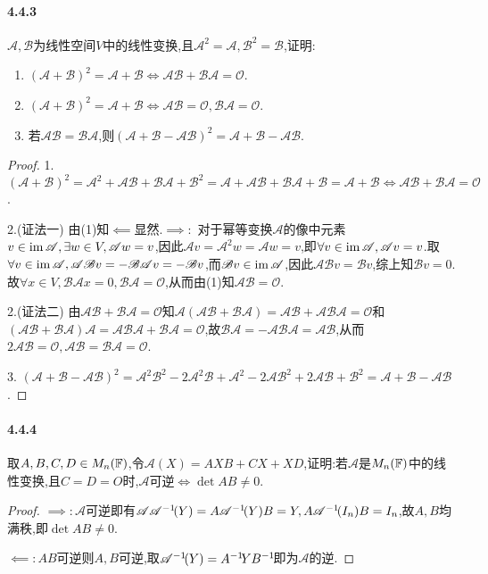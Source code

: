\documentclass[11pt]{article}
\begin{document}
\paragraph{4.4.3}$\mathscr{A,B}$为线性空间$V$中的线性变换,且$\mathscr{A}^2=\mathscr{A},\mathscr{B}^2=\mathscr{B}$,证明:
\begin{enumerate}
    \item $(\mathscr{A}+\mathscr{B})^2=\mathscr{A}+\mathscr{B}\iff \mathscr{AB}+\mathscr{BA}=\mathscr{O}$.
    \item $(\mathscr{A}+\mathscr{B})^2=\mathscr{A}+\mathscr{B}\iff \mathscr{AB=O},\mathscr{BA=O}$.
    \item 若$\mathscr{AB=BA}$,则$(\mathscr{A+B-AB})^2=\mathscr{A+B-AB}$.
\end{enumerate}
\begin{proof}
    1. $(\mathscr{A}+\mathscr{B})^2=\mathscr{A}^2+\mathscr{AB}+\mathscr{BA}+\mathscr{B}^2=\mathscr{A}+\mathscr{AB}+\mathscr{BA}+\mathscr{B}=\mathscr{A}+\mathscr{B}\iff \mathscr{AB}+\mathscr{BA}=\mathscr{O}$.

    2.(证法一) 由(1)知$\impliedby$显然.$\implies:$ 对于幂等变换$\mathscr{A}$的像中元素$v\in \operatorname{im} \mathscr{A}, \exists w\in V, \mathscr{A}w=v$,因此$\mathscr{A}v=\mathscr{A}^2w=\mathscr{A}w=v$,即$\forall v\in \operatorname{im} \mathscr{A}, \mathscr{A}v=v$.取$\forall v\in \operatorname{im} \mathscr{A}, \mathscr{AB}v=-\mathscr{BA}v=-\mathscr{B}v$,而$\mathscr{B}v\in \operatorname{im} \mathscr{A}$,因此$\mathscr{AB}v=\mathscr{B}v$,综上知$\mathscr{B}v=0$.故$\forall x\in V, \mathscr{BA}x=0, \mathscr{BA}=\mathscr{O}$,从而由(1)知$\mathscr{AB}=\mathscr{O}$.

    2.(证法二) 由$\mathscr{AB}+\mathscr{BA}=\mathscr{O}$知$\mathscr{A}(\mathscr{AB}+\mathscr{BA})=\mathscr{AB}+\mathscr{ABA}=\mathscr{O}$和$(\mathscr{AB}+\mathscr{BA})\mathscr{A}=\mathscr{ABA}+\mathscr{BA}=\mathscr{O}$,故$\mathscr{BA}=-\mathscr{ABA}=\mathscr{AB}$,从而$2\mathscr{AB}=\mathscr{O}, \mathscr{AB}=\mathscr{BA}=\mathscr{O}$.

    3. $(\mathscr{A+B-AB})^2=\mathscr{A}^2 \mathscr{B}^2-2 \mathscr{A}^2 \mathscr{B}+\mathscr{A}^2-2 \mathscr{A} \mathscr{B}^2+2 \mathscr{A} \mathscr{B}+\mathscr{B}^2=\mathscr{A}+\mathscr{B}-\mathscr{AB}$.
\end{proof}
\paragraph{4.4.4}取$A,B,C,D\in M_n(\mathbb{F})$,令$\mathscr{A}(X)=AXB+CX+XD$,证明:若$\mathscr{A}$是$M_n(\mathbb{F})$中的线性变换,且$C=D=O$时,$\mathscr{A}$可逆$\iff \det AB\neq 0$.
\begin{proof}
    $\implies:\mathscr{A}$可逆即有$\mathscr{A}\mathscr{A}^{-1}\!(Y)=A\mathscr{A}^{-1}\!(Y)B=Y, A\mathscr{A}^{-1}\!(I_n)B=I_n$,故$A,B$均满秩,即$\det AB\neq 0$.

    $\impliedby: AB$可逆则$A,B$可逆,取$\mathscr{A}^{-1}\!(Y)=A^{-1}\! Y B^{-1}\!$即为$\mathscr{A}$的逆.
\end{proof}
\end{document}
